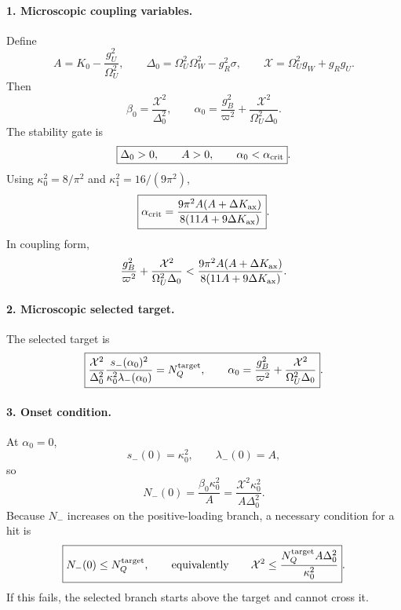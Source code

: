 \paragraph{1. Microscopic coupling variables.}
Define
\begin{equation}
\label{eq:app-stage033-defs}
\boxed{
A=K_0-\frac{g_U^2}{\Omega_U^2},
\qquad
\Delta_0=\Omega_U^2\Omega_W^2-g_R^2\sigma,
\qquad
\mathcal X=\Omega_U^2g_W+g_Rg_U}.
\end{equation}
Then
\begin{equation}
\label{eq:app-stage033-alpha-beta}
\boxed{
\beta_0=\frac{\mathcal X^2}{\Delta_0^2},
\qquad
\alpha_0=\frac{g_B^2}{\varpi^2}+\frac{\mathcal X^2}{\Omega_U^2\Delta_0}}.
\end{equation}
The stability gate is
\begin{equation}
\label{eq:app-stage033-stability}
\boxed{
\Delta_0>0,
\qquad
A>0,
\qquad
\alpha_0<\alpha_{\rm crit}}.
\end{equation}
Using \(\kappa_0^2=8/\pi^2\) and \(\kappa_1^2=16/(9\pi^2)\),
\begin{equation}
\label{eq:app-stage033-alpha-crit}
\boxed{
\alpha_{\rm crit}=\frac{9\pi^2A(A+\Delta K_{\rm ax})}{8(11A+9\Delta K_{\rm ax})}}.
\end{equation}
In coupling form,
\begin{equation}
\label{eq:app-stage033-coupling-stability}
\frac{g_B^2}{\varpi^2}+\frac{\mathcal X^2}{\Omega_U^2\Delta_0}
<
\frac{9\pi^2A(A+\Delta K_{\rm ax})}{8(11A+9\Delta K_{\rm ax})}.
\end{equation}

\paragraph{2. Microscopic selected target.}
The selected target is
\begin{equation}
\label{eq:app-stage033-micro-target}
\boxed{
\frac{\mathcal X^2}{\Delta_0^2}\frac{s_-(\alpha_0)^2}{\kappa_0^2\lambda_-(\alpha_0)}=N_Q^{\rm target},
\qquad
\alpha_0=\frac{g_B^2}{\varpi^2}+\frac{\mathcal X^2}{\Omega_U^2\Delta_0}}.
\end{equation}

\paragraph{3. Onset condition.}
At \(\alpha_0=0\),
\begin{equation}
s_-(0)=\kappa_0^2,
\qquad
\lambda_-(0)=A,
\end{equation}
so
\begin{equation}
\label{eq:app-stage033-Nzero}
\boxed{
N_-(0)=\frac{\beta_0\kappa_0^2}{A}
=\frac{\mathcal X^2\kappa_0^2}{A\Delta_0^2}}.
\end{equation}
Because \(N_-\) increases on the positive-loading branch, a necessary condition for a hit is
\begin{equation}
\label{eq:app-stage033-onset}
\boxed{
N_-(0)\leq N_Q^{\rm target},
\qquad
\text{equivalently}\qquad
\mathcal X^2\leq\frac{N_Q^{\rm target}A\Delta_0^2}{\kappa_0^2}}.
\end{equation}
If this fails, the selected branch starts above the target and cannot cross it.

